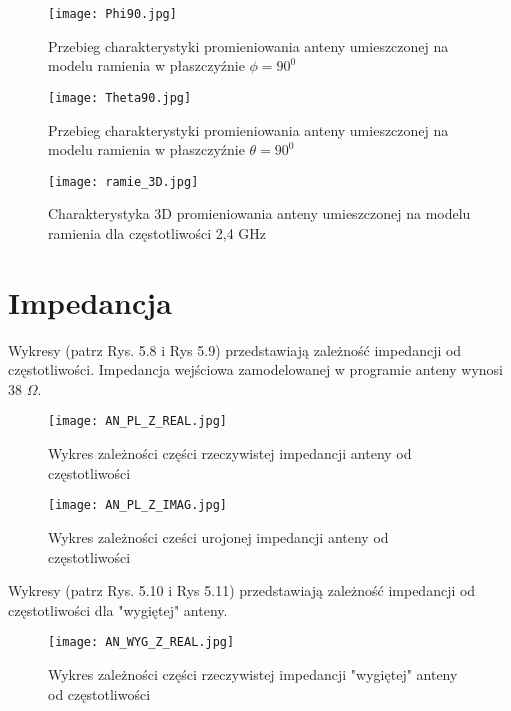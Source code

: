 \begin{figure}[H]
\centering
	\texttt{[image: Phi90.jpg]}
	\caption{Przebieg charakterystyki promieniowania anteny umieszczonej na modelu ramienia w płaszczyźnie $\phi = 90^{0}$}
\end{figure}



\begin{figure}[h!]
\centering
	\texttt{[image: Theta90.jpg]}
	\caption{Przebieg charakterystyki promieniowania anteny umieszczonej na modelu ramienia w płaszczyźnie $\theta = 90^{0}$}
\end{figure}


\begin{figure}[H]
\centering
	\texttt{[image: ramie\_3D.jpg]}
	\caption{Charakterystyka 3D promieniowania anteny umieszczonej na modelu ramienia dla częstotliwości 2,4 GHz}
\end{figure}





\newpage

\section{Impedancja} 
Wykresy (patrz Rys. 5.8 i Rys 5.9) przedstawiają zależność impedancji od częstotliwości. Impedancja wejściowa zamodelowanej w programie anteny wynosi 38 \(\Omega\).

\begin{figure}[h!]
\centering
	\texttt{[image: AN\_PL\_Z\_REAL.jpg]}
	\caption{Wykres zależności części rzeczywistej impedancji anteny od częstotliwości}
\end{figure}

\newpage
\begin{figure}[h!]
\centering
	\texttt{[image: AN\_PL\_Z\_IMAG.jpg]}
	\caption{Wykres zależności cześci urojonej impedancji anteny od częstotliwości}
\end{figure}




\newpage
Wykresy (patrz Rys. 5.10 i Rys 5.11) przedstawiają zależność impedancji od częstotliwości dla "wygiętej" anteny. 
\begin{figure}[h!]
\centering
	\texttt{[image: AN\_WYG\_Z\_REAL.jpg]}
	\caption{Wykres zależności części rzeczywistej impedancji "wygiętej" anteny  od częstotliwości}
\end{figure}

